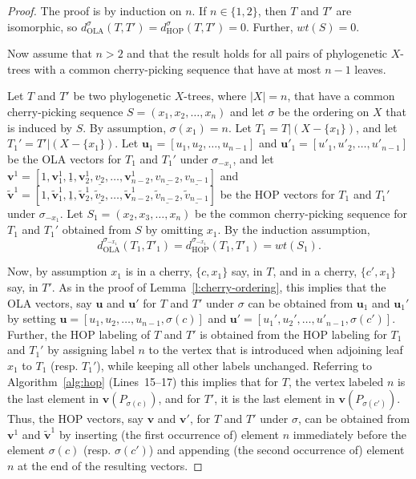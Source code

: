 \documentclass{article}
\newcommand{\HOP}{\mathrm{HOP}}
\newcommand{\OLA}{\mathrm{OLA}}
\begin{document}
\begin{proof}
The proof is by induction on $n$. If $n \in \{1,2\}$, then $T$ and $T'$ are isomorphic, so $d_{\OLA}^{\sigma}(T,T') = d_{\HOP}^{\sigma}(T,T') = 0$. Further, $wt(S)=0$. 

Now assume that $n > 2$ and that the result holds for all pairs of phylogenetic $X$-trees with a common cherry-picking sequence that have at most $n-1$ leaves. 

Let $T$ and $T'$ be two phylogenetic $X$-trees, where $|X|=n$, that have a common cherry-picking sequence $S = (x_1,x_2, \ldots, x_n)$ and let $\sigma$ be the ordering on $X$ that is induced by $S$.
By assumption, $\sigma(x_1)=n$. Let $T_1 = T|(X- \{x_1\})$, and let $T_1' = T'|(X - \{x_1\})$. Let $\mathbf{u}_1=[u_1,u_2,\ldots, u_{n-1}]$ and $\mathbf{u}'_1=[u'_1,u'_2, \ldots, u'_{n-1}]$ be the OLA vectors for $T_1$ and $T_1'$ under $\sigma_{- x_1}$, and let $\mathbf{v}^1=[1,\mathbf{v}^1_1, \underline{1}, \mathbf{v}^1_2, \underline{v_2},\ldots, \mathbf{v}^1_{n-2}, \underline{v_{n-2}},\underline{v_{n-1}}]$ and $\mathbf{\widetilde{v}}^1=[1,\mathbf{\widetilde{v}}^1_1, \underline{1}, \mathbf{\widetilde{v}}^1_2, \underline{\widetilde{v}_2},\ldots, \mathbf{\widetilde{v}}^1_{n-2}, \underline{\widetilde{v}_{n-2}},\underline{\widetilde{v}_{n-1}}]$ be the HOP vectors for $T_1$ and $T_1'$ under $\sigma_{- x_1}$. Let $S_1 = (x_2,x_3, \ldots, x_n)$ be the common cherry-picking sequence for $T_1$ and $T_1'$ obtained from $S$ by omitting $x_1$. 
By the induction assumption, 
\begin{equation} \label{OLA-HOP-S-IA}
    d_{\OLA}^{\sigma_{-x_1}}(T_1,T'_1) = d_{\HOP}^{\sigma_{- x_1}}(T_1,T'_1) = wt(S_1). 
\end{equation}

Now, by assumption $x_1$ is in a cherry, $\{c,x_1\}$ say, in $T$, and in a cherry, $\{c', x_1\}$ say, in $T'$. As in the proof of Lemma~\ref{l:cherry-ordering}, this implies that the OLA vectors, say $\mathbf{u}$ and $\mathbf{u}'$ for $T$ and $T'$ under $\sigma$ can be obtained from $\mathbf{u}_1$ and $\mathbf{u}_1'$ by setting $\mathbf{u} = [u_1, u_2,\ldots, u_{n-1},\sigma(c)]$ and $\mathbf{u}' = [u_1',u_2',\ldots, u'_{n-1},\sigma(c')]$. Further, the HOP labeling of $T$ and $T'$ is obtained from the HOP labeling for $T_1$ and $T_1'$ by assigning label $n$ to the vertex that is introduced when adjoining leaf $x_1$ to $T_1$ (resp. $T_1'$), while keeping all other labels unchanged. Referring to Algorithm~\ref{alg:hop} (Lines~15--17) this implies that for $T$, the vertex labeled $n$ is the last element in $\mathbf{v}(P_{\sigma(c)})$, and for $T'$, it is the last element in $\mathbf{v}(P_{\sigma(c')})$. Thus, the HOP vectors, say $\mathbf{v}$ and $\mathbf{v}'$, for $T$ and $T'$ under $\sigma$, can be obtained from $\mathbf{v}^1$ and $\mathbf{\widetilde{v}}^1$ by inserting (the first occurrence of) element $n$ immediately before the element $\sigma(c)$ (resp. $\sigma(c')$) and appending (the second occurrence of) element $n$ at the end of the resulting vectors.


\end{proof}
\end{document}
